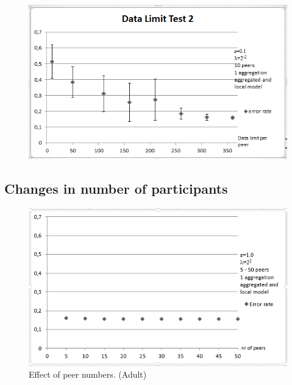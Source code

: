 \begin{figure}[H]
	\begin{minipage}{.65\linewidth}
		\includegraphics[width=\linewidth]{fig/spambase/data_limit_test_withlocalmodel}
		\label{fig:data_limit_test_withlocalmodel}
	\end{minipage}
\end{figure}


\subsection{Changes in number of participants}
\begin{figure}[H]
	\centering
	\includegraphics[width=\textwidth]{fig/adult/peer_range_constant_group}
	\caption{Effect of peer numbers. (Adult)}
	\label{fig:peer_range_constant_group}
\end{figure}


